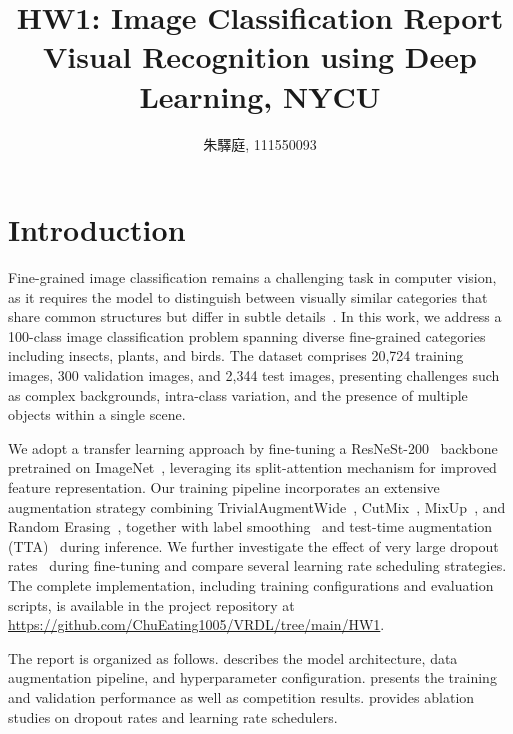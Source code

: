 \documentclass[10pt,twocolumn,letterpaper]{article}
\begin{document}
\title{\LARGE HW1: Image Classification Report \\[0.5em] \large Visual Recognition using Deep Learning, NYCU}
\author{朱驛庭, 111550093}
\maketitle


\section{Introduction}
\label{sec:intro}

Fine-grained image classification remains a challenging task in computer vision, as it requires the model to distinguish between visually similar categories that share common structures but differ in subtle details~\cite{he2016resnet}. In this work, we address a 100-class image classification problem spanning diverse fine-grained categories including insects, plants, and birds. The dataset comprises 20,724 training images, 300 validation images, and 2,344 test images, presenting challenges such as complex backgrounds, intra-class variation, and the presence of multiple objects within a single scene.

We adopt a transfer learning approach by fine-tuning a ResNeSt-200~\cite{zhang2022resnest} backbone pretrained on ImageNet~\cite{deng2009imagenet}, leveraging its split-attention mechanism for improved feature representation. Our training pipeline incorporates an extensive augmentation strategy combining TrivialAugmentWide~\cite{muller2021trivialaugment}, CutMix~\cite{yun2019cutmix}, MixUp~\cite{zhang2018mixup}, and Random Erasing~\cite{zhong2020random_erasing}, together with label smoothing~\cite{szegedy2016label_smoothing} and test-time augmentation (TTA)~\cite{krizhevsky2012alexnet} during inference. We further investigate the effect of very large dropout rates~\cite{zhang2024finetune_large_dropout} during fine-tuning and compare several learning rate scheduling strategies.  The complete implementation, including training configurations and evaluation scripts, is available in the project repository at \url{https://github.com/ChuEating1005/VRDL/tree/main/HW1}.

The report is organized as follows.  describes the model architecture, data augmentation pipeline, and hyperparameter configuration.  presents the training and validation performance as well as competition results.  provides ablation studies on dropout rates and learning rate schedulers.
\end{document}
